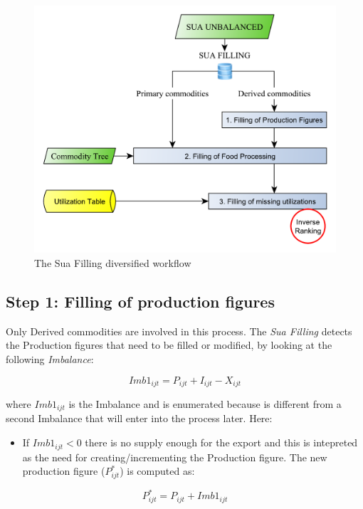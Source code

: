 \documentclass[]{article}
\providecommand{\tightlist}{%
  \setlength{\itemsep}{0pt}\setlength{\parskip}{0pt}}
\begin{document}
\begin{figure}

{\centering \includegraphics[width=0.65\linewidth]{images/04_SuaFilling2} 

}

\caption{\label{fig:f4}The Sua Filling diversified workflow}\label{fig:f4}
\end{figure}

\subsection*{Step 1: Filling of production
figures}\label{step-1-filling-of-production-figures}

Only Derived commodities are involved in this process. The \emph{Sua
Filling} detects the Production figures that need to be filled or
modified, by looking at the following \emph{Imbalance}:

\begin{equation}
\label{eq:imbalance1}
Imb1_{ijt} = P_{ijt} + I_{ijt} - X_{ijt}
\end{equation}

where \(Imb1_{ijt}\) is the Imbalance and is enumerated because is
different from a second Imbalance that will enter into the process
later. Here:

\begin{itemize}
\tightlist
\item
  If \(Imb1_{ijt} < 0\) there is no supply enough for the export and
  this is intepreted as the need for creating/incrementing the
  Production figure. The new production figure (\(P^*_{ijt}\)) is
  computed as:
\end{itemize}

\begin{equation}
\label{eq:imbalance1}
 P^*_{ijt} = P_{ijt} + Imb1_{ijt}
\end{equation}
\end{document}
